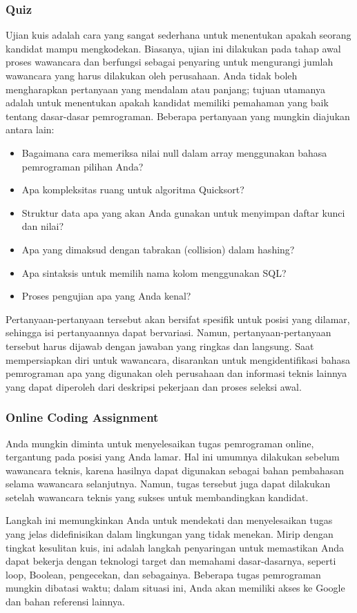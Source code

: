 \documentclass{article}
\begin{document}
\subsubsection{Quiz}
Ujian kuis adalah cara yang sangat sederhana untuk menentukan apakah seorang kandidat mampu mengkodekan. Biasanya, ujian ini dilakukan pada tahap awal proses wawancara dan berfungsi sebagai penyaring untuk mengurangi jumlah wawancara yang harus dilakukan oleh perusahaan. Anda tidak boleh mengharapkan pertanyaan yang mendalam atau panjang; tujuan utamanya adalah untuk menentukan apakah kandidat memiliki pemahaman yang baik tentang dasar-dasar pemrograman. Beberapa pertanyaan yang mungkin diajukan antara lain:
\begin{itemize}
    \item Bagaimana cara memeriksa nilai null dalam array menggunakan bahasa pemrograman pilihan Anda?
    \item Apa kompleksitas ruang untuk algoritma Quicksort?
    \item Struktur data apa yang akan Anda gunakan untuk menyimpan daftar kunci dan nilai?
    \item Apa yang dimaksud dengan tabrakan (collision) dalam hashing?
    \item Apa sintaksis untuk memilih nama kolom menggunakan SQL?
    \item Proses pengujian apa yang Anda kenal?
\end{itemize}
Pertanyaan-pertanyaan tersebut akan bersifat spesifik untuk posisi yang dilamar, sehingga isi pertanyaannya dapat bervariasi. Namun, pertanyaan-pertanyaan tersebut harus dijawab dengan jawaban yang ringkas dan langsung. Saat mempersiapkan diri untuk wawancara, disarankan untuk mengidentifikasi bahasa pemrograman apa yang digunakan oleh perusahaan dan informasi teknis lainnya yang dapat diperoleh dari deskripsi pekerjaan dan proses seleksi awal.

\subsubsection{Online Coding Assignment}
Anda mungkin diminta untuk menyelesaikan tugas pemrograman online, tergantung pada posisi yang Anda lamar. Hal ini umumnya dilakukan sebelum wawancara teknis, karena hasilnya dapat digunakan sebagai bahan pembahasan selama wawancara selanjutnya. Namun, tugas tersebut juga dapat dilakukan setelah wawancara teknis yang sukses untuk membandingkan kandidat.

Langkah ini memungkinkan Anda untuk mendekati dan menyelesaikan tugas yang jelas didefinisikan dalam lingkungan yang tidak menekan. Mirip dengan tingkat kesulitan kuis, ini adalah langkah penyaringan untuk memastikan Anda dapat bekerja dengan teknologi target dan memahami dasar-dasarnya, seperti loop, Boolean, pengecekan, dan sebagainya. Beberapa tugas pemrograman mungkin dibatasi waktu; dalam situasi ini, Anda akan memiliki akses ke Google dan bahan referensi lainnya.
\end{document}

